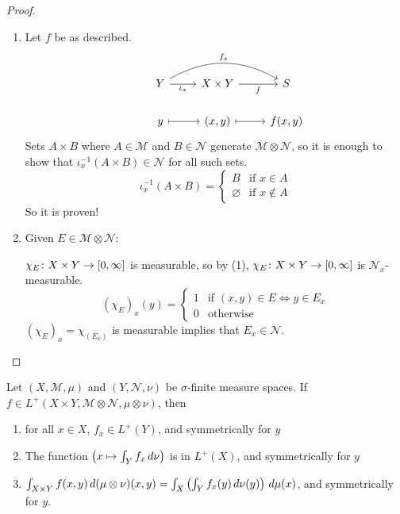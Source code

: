 \documentclass[11pt,leqno,oneside]{amsbook}
\numberwithin{thm}{section}
\newcommand{\M}{\mathcal{M}} %
\newcommand{\cN}{\mathcal{N}}
\newcommand{\s}{$\sigma$-} %
\newcommand{\x}{\times}
\newcommand{\ox}{\otimes}
\renewcommand{\emptyset}{\varnothing}
\begin{document}
\begin{proof}
  \mbox{}
  \begin{enumerate}[label=(\arabic{*})]
    \item Let $f$ be as described.
    $$\begin{tikzcd}
      &Y \arrow[rr, bend left, "f_x"] \arrow[r, "\iota_x"'] &X \x Y \arrow[r, "f"'] &S \\
      &y \arrow[r, mapsto] &(x,y) \arrow[r, mapsto] &f(x,y)
    \end{tikzcd}$$
    Sets $A \x B$ where $A \in \M$ and $B \in \cN$ generate $\M \ox \cN$, so it is enough to show that $\iota^{-1}_x(A \x B) \in \cN$ for all such sets. $$\iota^{-1}_x(A \x B) = \begin{cases}
      B &\text{if $x \in A$} \\
      \emptyset &\text{if $x \not\in A$}
    \end{cases}$$
    So it is proven!

    \item Given $E \in \M \ox \cN$:

    $\chi_E\from X \x Y \to [0, \oo]$ is measurable, so by (1), $\chi_E \from X \x Y \to [0, \oo]$ is $\cN_x$-measurable. $$(\chi_E)_x(y) = \begin{cases}
      1 &\text{if $(x,y) \in E \iff y \in E_x$} \\
      0 &\text{otherwise}
    \end{cases}$$
    $(\chi_E)_x = \chi_{(E_x)}$ is measurable implies that $E_x \in \cN$.
  \end{enumerate}
\end{proof}
\begin{thm}
  Let $(X, \M, \mu)$ and $(Y, \cN, \nu)$ be \s finite measure spaces.  If $f \in L^+(X \x Y, \M \ox \cN, \mu \ox \nu)$, then
  \begin{enumerate}[label=(\arabic{*})]
    \item for all $x \in X$, $f_x \in L^+(Y)$, and symmetrically for $y$
    \item The function $\left(x \mapsto \int_Y f_x \, d\nu\right)$ is in $L^+(X)$, and symmetrically for $y$
    \item $\int_{X \x Y} f(x,y) \d(\mu \ox \nu)(x,y) = \int_X\left(\int_Y f_x(y) \d\nu(y)\right)\d\mu(x)$, and symmetrically for $y$.
  \end{enumerate}
\end{thm}
\end{document}
